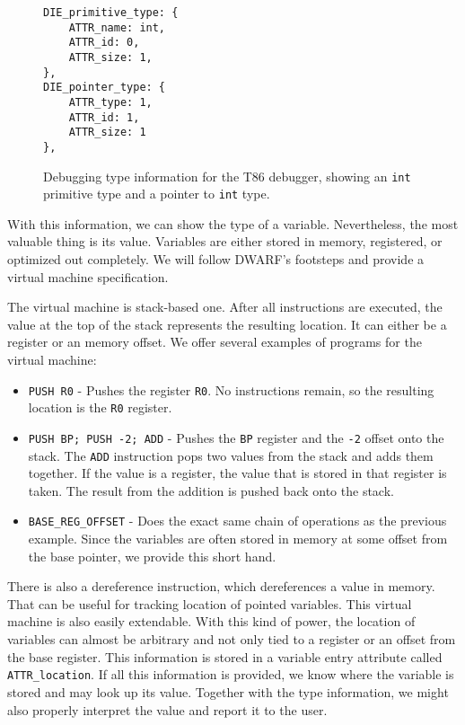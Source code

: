 \begin{figure}
    \begin{lstlisting}
DIE_primitive_type: {
    ATTR_name: int,
    ATTR_id: 0,
    ATTR_size: 1,
},
DIE_pointer_type: {
    ATTR_type: 1,
    ATTR_id: 1,
    ATTR_size: 1
},
    \end{lstlisting}
    \caption{Debugging type information for the T86 debugger, showing an
    \texttt{int} primitive type and a pointer to \texttt{int} type.}
    \label{fig:t86dbg-types}
\end{figure}

With this information, we can show the type of a variable. Nevertheless, the
most valuable thing is its value. Variables are either stored in memory,
registered, or optimized out completely. We will follow DWARF's footsteps and
provide a virtual machine specification.

The virtual machine is stack-based one. After all instructions are executed,
the value at the top of the stack represents the resulting location. It can
either be a register or an memory offset. We offer several examples of programs
for the virtual machine:
\begin{itemize}
    \item \texttt{PUSH R0} - Pushes the register \texttt{R0}. No instructions
        remain, so the resulting location is the \texttt{R0} register.
    \item \texttt{PUSH BP; PUSH -2; ADD} - Pushes the \texttt{BP} register and
        the \texttt{-2} offset onto the stack. The \texttt{ADD} instruction
        pops two values from the stack and adds them together. If the value is
        a register, the value that is stored in that register is taken. The
        result from the addition is pushed back onto the stack.
    \item \verb|BASE_REG_OFFSET| - Does the exact same chain of operations as
        the previous example. Since the variables are often stored in memory at
        some offset from the base pointer, we provide this short hand.
\end{itemize}

There is also a dereference instruction, which dereferences a value in memory.
That can be useful for tracking location of pointed variables. This virtual
machine is also easily extendable. With this kind of power, the location of
variables can almost be arbitrary and not only tied to a register or an offset
from the base register. This information is stored in a variable entry
attribute called \texttt{ATTR\_location}. If all this information is provided,
we know where the variable is stored and may look up its value. Together with
the type information, we might also properly interpret the value and report it
to the user.

